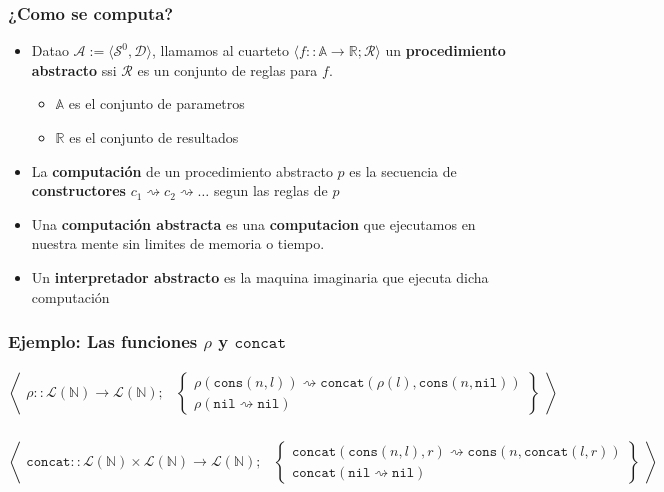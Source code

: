 \documentclass{beamer}
\begin{document}
\begin{frame}
    \frametitle{¿Como se computa?}
    \begin{itemize}
        \item{Datao $\mathcal{A}:=\langle \mathcal{S}^0,\mathcal{D} \rangle$, llamamos
        al cuarteto $\langle f::\mathbb{A}\rightarrow\mathbb{R};\mathcal{R} \rangle$
        un {\bf procedimiento abstracto} ssi $\mathcal{R}$ es un conjunto de reglas
        para $f$.
        \begin{itemize}
            \item{$\mathbb{A}$ es el conjunto de parametros}
            \item{$\mathbb{R}$ es el conjunto de resultados}
        \end{itemize}
        }
        \item{La {\bf computaci\'on} de un procedimiento abstracto $p$ es
        la secuencia de {\bf constructores} $c_1\rightsquigarrow c_2\rightsquigarrow \ldots$
        segun las reglas de $p$}
        \item{Una {\bf computaci\'on abstracta} es una {\bf computacion} que ejecutamos
        en nuestra mente sin limites de memoria o tiempo.}
        \item{Un {\bf interpretador abstracto} es la maquina imaginaria que ejecuta
        dicha computaci\'on}
    \end{itemize}
\end{frame}

\begin{frame}
    \frametitle{Ejemplo: Las funciones $\rho$ y $\mathtt{concat}$}
        \tiny{
        $$
        \left\langle
            \begin{array}{ll}
            \rho::\mathcal{L}(\mathbb{N}) \rightarrow \mathcal{L}(\mathbb{N}); &
            {
                \left\{
                \begin{array}{l}
                    \rho(\mathtt{cons}(n,l)) \rightsquigarrow \mathtt{concat}(\rho(l), \mathtt{cons}(n,\mathtt{nil})) \\
                    \rho(\mathtt{nil}\rightsquigarrow \mathtt{nil})
                \end{array}
                \right\}
            }
            \end{array}
        \right\rangle
        $$
        \\
        $$
        \left\langle
            \begin{array}{ll}
            \mathtt{concat}::\mathcal{L}(\mathbb{N})\times\mathcal{L}(\mathbb{N}) \rightarrow \mathcal{L}(\mathbb{N}); &
            {
                \left\{
                \begin{array}{l}
                    \mathtt{concat}(\mathtt{cons}(n,l), r) \rightsquigarrow \mathtt{cons}(n, \mathtt{concat}(l,r)) \\
                    \mathtt{concat}(\mathtt{nil}\rightsquigarrow \mathtt{nil})
                \end{array}
                \right\}
            }
            \end{array}
        \right\rangle
        $$
        }
\end{frame}
\end{document}
